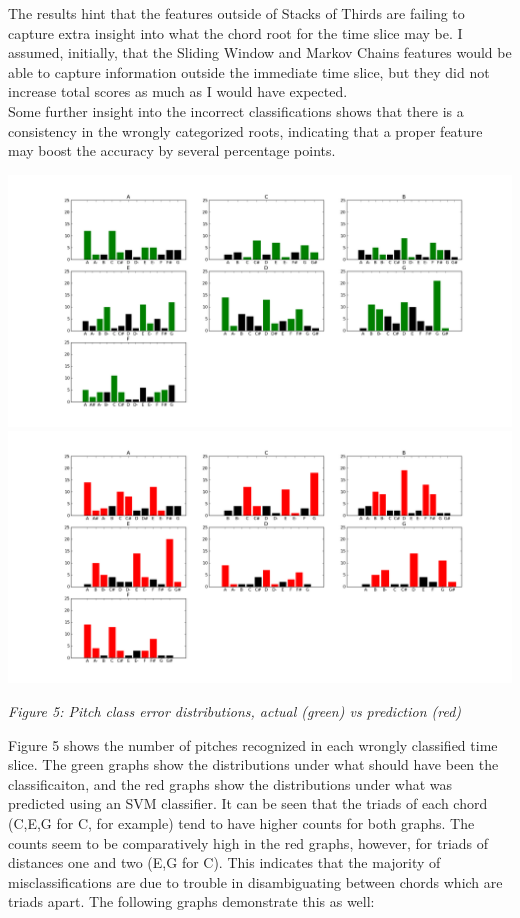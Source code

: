 \documentclass[12pt]{article}
\begin{document}
The results hint that the features outside of Stacks of Thirds are failing to capture extra insight into what the chord root for the time slice may be. I assumed, initially, that the Sliding Window and Markov Chains features would be able to capture information outside the immediate time slice, but they did not increase total scores as much as I would have expected. \\

Some further insight into the incorrect classifications shows that there is a consistency in the wrongly categorized roots, indicating that a proper feature may boost the accuracy by several percentage points.


\newpage
\includegraphics[trim = 220 50 0 30, scale=.45]{actual.png}
\includegraphics[trim = 220 50 0 0, scale=.45]{pred.png}
\begin{center}\emph{Figure 5: Pitch class error distributions, actual (green) vs prediction (red)}\\ \end{center}

\newpage

Figure 5 shows the number of pitches recognized in each wrongly classified time slice. The green graphs show the distributions under what should have been the classificaiton, and the red graphs show the distributions under what was predicted using an SVM classifier. It can be seen that the triads of each chord (C,E,G for C, for example) tend to have higher counts for both graphs. The counts seem to be comparatively high in the red graphs, however, for triads of distances one and two (E,G for C). This indicates that the majority of misclassifications are due to trouble in disambiguating between chords which are triads apart.  The following graphs demonstrate this as well:
\end{document}
